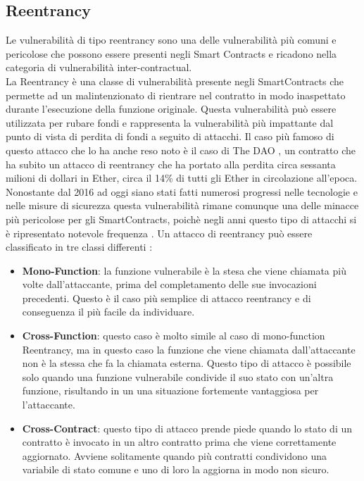 \documentclass[../../Thesis.tex]{subfiles}
\begin{document}
\subsection{Reentrancy}
Le vulnerabilità di tipo reentrancy sono una delle vulnerabilità più comuni e pericolose che possono essere presenti negli Smart Contracts e ricadono nella categoria di vulnerabilità inter-contractual.\\
La Reentrancy è una classe di vulnerabilità presente negli SmartContracts che permette ad un malintenzionato di rientrare nel contratto in modo inaspettato durante l'esecuzione della funzione originale. Questa vulnerabilità può essere utilizzata per rubare fondi e rappresenta la vulnerabilità più impattante dal punto di vista di perdita di fondi a seguito di attacchi.
Il caso più famoso di questo attacco che lo ha anche reso noto è il caso di The DAO \cite{DAO}, un contratto che ha subito un attacco di reentrancy che ha portato alla perdita circa sessanta milioni di dollari in Ether, circa il 14\% di tutti gli Ether in circolazione all'epoca. Nonostante dal 2016 ad oggi siano stati fatti numerosi progressi nelle tecnologie e nelle misure di sicurezza questa vulnerabilità rimane comunque una delle minacce più pericolose per gli SmartContracts, poichè negli anni questo tipo di attacchi si è ripresentato notevole frequenza \cite{reentrancy-historical}. Un attacco di reentrancy può essere classificato in tre classi differenti \cite{Zeus, Vulnerabilities}:
\begin{itemize}
    \item \textbf{Mono-Function}: la funzione vulnerabile è la stesa che viene chiamata più volte dall'attaccante, prima del completamento delle sue invocazioni precedenti. Questo è il caso più semplice di attacco reentrancy e di conseguenza il più facile da individuare.
    \item \textbf{Cross-Function}: questo caso è molto simile al caso di mono-function Reentrancy, ma in questo caso la funzione che viene chiamata dall'attaccante non è la stessa che fa la chiamata esterna. Questo tipo di attacco è possibile solo quando una funzione vulnerabile condivide il suo stato con un'altra funzione, risultando in un una situazione fortemente vantaggiosa per l'attaccante. 
    \item \textbf{Cross-Contract}: questo tipo di attacco prende piede quando lo stato di un contratto è invocato in un altro contratto prima che viene correttamente aggiornato. Avviene solitamente quando più contratti condividono una variabile di stato comune e uno di loro la aggiorna in modo non sicuro. 
\end{itemize}
\end{document}
